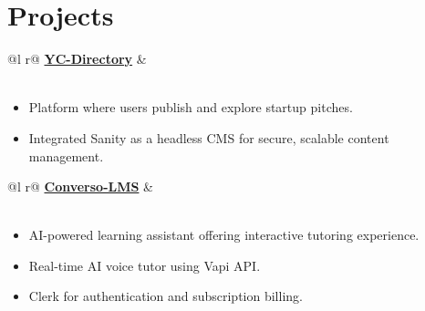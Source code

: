 \documentclass[a4paper,12pt]{article}
\begin{document}
\section{Projects}

\begin{tabularx}{\linewidth}{ @{}l r@{} }
\textbf{\href{https://yc-directory-bjf3.vercel.app/}{YC-Directory}} &  \\[-2pt]
 \\
\end{tabularx}

\begin{itemize}[nosep, leftmargin=1em, itemsep=3pt]
  \item Platform where users publish and explore startup pitches.
  \item Integrated Sanity as a headless CMS for secure, scalable content management.
\end{itemize}

\vspace{8pt}

\begin{tabularx}{\linewidth}{ @{}l r@{} }
\textbf{\href{https://github.com/rudrakshSoni-dev/conversoLMS}{Converso-LMS}} &  \\[-2pt]
 \\
\end{tabularx}

\begin{itemize}[nosep, leftmargin=1em, itemsep=3pt]
  \item AI-powered learning assistant offering interactive tutoring experience.
  \item Real-time AI voice tutor using Vapi API.
  \item Clerk for authentication and subscription billing.
\end{itemize}


\end{document}
